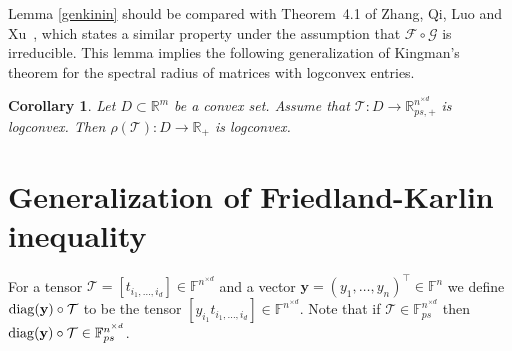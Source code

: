 \documentclass{amsart}
\newcommand{\diag}{\operatorname{diag}}
\newcommand{\F}{\mathbb{F}}
\newcommand{\R}{\mathbb{R}}
\newcommand{\y}{\mathbf{y}}
\newcommand{\0}{\mathbf{0}}
\newcommand{\1}{\mathbf{1}}
\newcommand{\cF}{\mathcal{F}}
\newcommand{\cG}{\mathcal{G}}
\newcommand{\cT}{\mathcal{T}}
\def\diag{\mathop{{\rm diag}}\nolimits}
\newcommand{\trans}{^\top}
\newtheorem{corollary}[theo]{Corollary}
\theoremstyle{remark}
\numberwithin{equation}{section} %
\begin{document}
 Lemma \ref{genkinin} should be compared with Theorem~4.1 of 
Zhang, Qi, Luo and Xu~\cite{ZQL10}, which states a similar property
under the assumption that $\cF\circ\cG$ is irreducible.
This lemma implies the following generalization of Kingman's theorem for the spectral radius of matrices with logconvex entries.
 \begin{corollary}\label{logconvsr}  Let $D\subset \R^m$ be a convex set.  Assume that $\cT:D\to \R_{ps,+}^{n^{\times d}}$ is logconvex.
 Then $\rho(\cT):D\to\R_+$ is logconvex.
 \end{corollary}
%
%
%
%
%
%
%
%
%











 \section{Generalization of Friedland-Karlin inequality}\label{sec:FKineq}
  For a tensor $\cT=[t_{i_1,\ldots,i_d}]\in \F^{n^{\times d}}$ and a vector $\y=(y_1,\ldots,y_n)\trans \in\F^{n}$ we define $\diag(\y)\circ \cT$ to be the tensor  $[y_{i_1}t_{i_1,\ldots,i_d}]\in \F^{n^{\times d}}$.   Note that if $\cT\in \F^{n^{\times d}}_{ps}$ then  $\diag(\y)\circ \cT\in \F^{n^{\times d}}_{ps}$.
  
\end{document}
